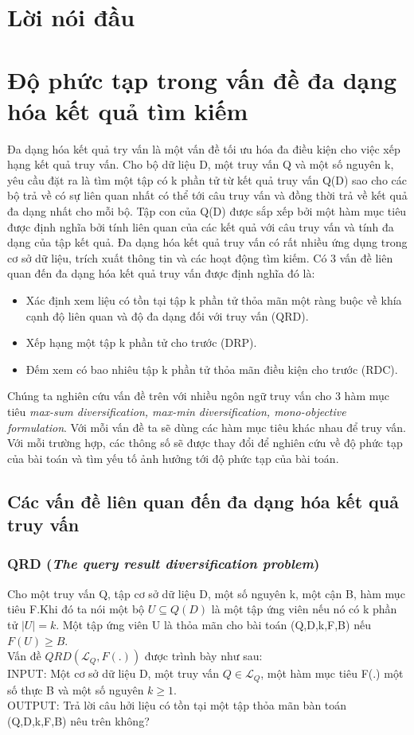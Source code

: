 \documentclass[12pt]{report}
\begin{document}
\newpage
\setcounter{page}{1}

\section*{Lời nói đầu}

\section{Độ phức tạp trong vấn đề đa dạng hóa kết quả tìm kiếm}
Đa dạng hóa kết quả try vấn là một vấn đề tối ưu hóa đa điều kiện cho việc xếp hạng kết quả truy  vấn. Cho bộ dữ liệu D, một truy vấn Q và một số nguyên k, yêu cầu đặt ra là tìm một tập có k phần tử từ kết quả truy vấn Q(D) sao cho các bộ trả về có sự liên quan nhất có thể tới câu truy vấn và đồng thời trả về kết quả đa dạng nhất cho mỗi bộ. Tập con của Q(D) được sắp xếp bởi một hàm mục tiêu được định nghĩa bởi tính liên quan của các kết quả với câu truy vấn và tính đa dạng của tập kết quả. Đa dạng hóa kết quả truy vấn có rất nhiều ứng dụng trong cơ sở dữ liệu, trích xuất thông tin và các hoạt động tìm kiếm.
Có 3 vấn đề liên quan đến đa dạng hóa kết quả truy vấn được định nghĩa đó là:
  \begin{itemize}
  \item Xác định xem liệu có tồn tại tập k phần tử thỏa mãn một ràng buộc về khía cạnh độ liên quan và độ đa dạng đối với truy vấn (QRD).
  \item Xếp hạng một tập k phần tử cho trước (DRP).
  \item Đếm xem có bao nhiêu tập k phần tử thỏa mãn điều kiện cho trước (RDC).
  \end{itemize}
Chúng ta nghiên cứu vấn đề trên với nhiều ngôn ngữ truy vấn cho 3 hàm mục tiêu \textit{max-sum diversification, max-min diversification, mono-objective formulation}.
Với mỗi vấn đề ta sẽ dùng các hàm mục tiêu khác nhau để truy vấn. Với mỗi trường hợp, các thông số sẽ được thay đổi để nghiên cứu về độ phức tạp của bài toán và tìm yếu tố ảnh hưởng tới độ phức tạp của bài toán. 
\subsection{Các vấn đề liên quan đến đa dạng hóa kết quả truy vấn}
	\subsubsection{QRD  (\textit{The query result diversification problem}) }
	Cho một truy vấn Q, tập cơ sở dữ liệu D, một số nguyên k, một cận B, hàm mục tiêu F.Khi đó ta nói một bộ $ U \subseteq Q(D) $ là một tập ứng viên nếu nó có k phần tử $|U| = k$. Một tập ứng viên U là thỏa mãn cho bài toán (Q,D,k,F,B) nếu $F(U) \ge B$.\\
	Vấn đề $QRD(\mathcal{L}_Q,F(.))$ được trình bày như sau: \\
	INPUT: 	Một cơ sở dữ liệu D, một truy vấn $Q\in \mathcal{L}_Q$, một hàm mục tiêu F(.) một số thực B và một số nguyên $k\ge1$.\\
	OUTPUT: Trả lời câu hởi liệu có tồn tại một tập thỏa mãn bàn toán (Q,D,k,F,B) nêu trên không?
\end{document}
